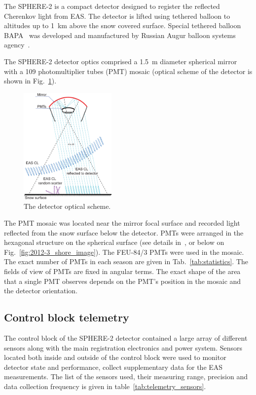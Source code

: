 \documentclass[final,5p,times,twocolumn]{elsarticle}
\begin{document}
The \mbox{SPHERE-2} is a compact detector designed to register the reflected Cherenkov light from EAS. The detector is lifted using tethered balloon to altitudes up to 1~km above the snow covered surface. Special tethered balloon BAPA~\cite{Ant20} was developed and manufactured by Russian Augur balloon systems agency~\cite{Augur}.

The \mbox{SPHERE-2} detector optics comprised a 1.5~m diameter spherical mirror with a 109 photomultiplier tubes (PMT) mosaic (optical scheme of the detector is shown in Fig.~\ref{fig:optics}).

\begin{figure}[bt]
\centering
    \includegraphics[width=0.42\textwidth]{optics.eps}
    \caption{The detector optical scheme.}
\label{fig:optics}
\end{figure}

The PMT mosaic was located near the mirror focal surface and recorded light reflected from the snow surface below the detector. PMTs were arranged in the hexagonal structure on the spherical surface (see details in~\cite{Ant20}, or below on Fig.~\ref{fig:2012-3_shore_image}). The FEU-84/3 PMTs were used in the mosaic. The exact number of PMTs in each season are given in Tab.~\ref{tab:statistics}. The fields of view of PMTs are fixed in angular terms. The exact shape of the area that a single PMT observes depends on the PMT's position in the mosaic and the detector orientation.

\subsection{Control block telemetry}

The control block of the SPHERE-2 detector contained a large array of different sensors along with the main registration electronics and power system. Sensors located both inside and outside of the control block were used to monitor detector state and performance, collect supplementary data for the EAS measurements. The list of the sensors used, their measuring range, precision and data collection frequency is given in table~\ref{tab:telemetry_sensors}. 
\end{document}
